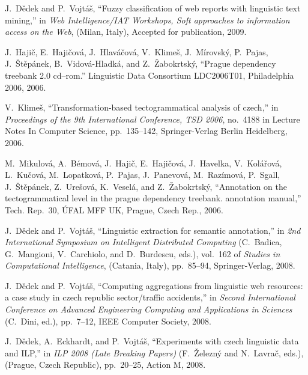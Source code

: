 \begin{thebibliography}{10}

J.~D\v{e}dek and P.~Vojt{\'a}\v{s}, ``Fuzzy classification of web reports with
  linguistic text mining,'' in {\em Web Intelligence/IAT Workshops, Soft
  approaches to information access on the Web}, (Milan, Italy), Accepted for
  publication, 2009.

J.~Haji{\v{c}}, E.~Haji{\v{c}}ov{\'{a}}, J.~Hlav{\'{a}}{\v{c}}ov{\'{a}},
  V.~Klime\v{s}, J.~M\'{i}rovsk\'{y}, P.~Pajas, J.~{\v{S}}t{\v{e}}p{\'{a}}nek,
  B.~Vidov{\'{a}}-Hladk{\'{a}}, and Z.~{\v{Z}}abokrtsk{\'{y}}, ``Prague
  dependency treebank 2.0 cd--rom.'' Linguistic Data Consortium LDC2006T01,
  Philadelphia 2006, 2006.

V.~Klime\v{s}, ``Transformation-based tectogrammatical analysis of czech,'' in
  {\em Proceedings of the 9th International Conference, {TSD} 2006}, no.~4188
  in Lecture Notes In Computer Science, pp.~135--142, Springer-Verlag Berlin
  Heidelberg, 2006.

M.~Mikulov\'{a}, A.~B\'{e}mov\'{a}, J.~Haji\v{c}, E.~Haji\v{c}ov\'{a},
  J.~Havelka, V.~Kol\'{a}\v{r}ov\'{a}, L.~Ku\v{c}ov\'{a}, M.~Lopatkov\'{a},
  P.~Pajas, J.~Panevov\'{a}, M.~Raz\'{i}mov\'{a}, P.~Sgall,
  J.~\v{S}t\v{e}p\'{a}nek, Z.~Ure\v{s}ov\'{a}, K.~Vesel\'{a}, and
  Z.~\v{Z}abokrtsk\'{y}, ``Annotation on the tectogrammatical level in the
  prague dependency treebank. annotation manual,'' Tech. Rep.~30, \'{U}{FAL}
  {MFF} {UK}, Prague, Czech Rep., 2006.

J.~D{\v{e}}dek and P.~Vojt{\'{a}}{\v{s}}, ``Linguistic extraction for semantic
  annotation,'' in {\em 2nd International Symposium on Intelligent Distributed
  Computing} (C.~Badica, G.~Mangioni, V.~Carchiolo, and D.~Burdescu, eds.),
  vol.~162 of {\em Studies in Computational Intelligence}, (Catania, Italy),
  pp.~85--94, Springer-Verlag, 2008.

J.~D{\v{e}}dek and P.~Vojt{\'{a}}{\v{s}}, ``Computing aggregations from
  linguistic web resources: a case study in czech republic sector/traffic
  accidents,'' in {\em Second International Conference on Advanced Engineering
  Computing and Applications in Sciences} (C.~Dini, ed.), pp.~7--12, {IEEE}
  Computer Society, 2008.

J.~D{\v{e}}dek, A.~Eckhardt, and P.~Vojt{\'{a}}{\v{s}}, ``Experiments with
  czech linguistic data and {ILP},'' in {\em {ILP} 2008 (Late Breaking Papers)}
  (F.~{\v{Z}}elezn{\'{y}} and N.~Lavra{\v{c}}, eds.), (Prague, Czech Republic),
  pp.~20--25, Action M, 2008.


\end{thebibliography}
